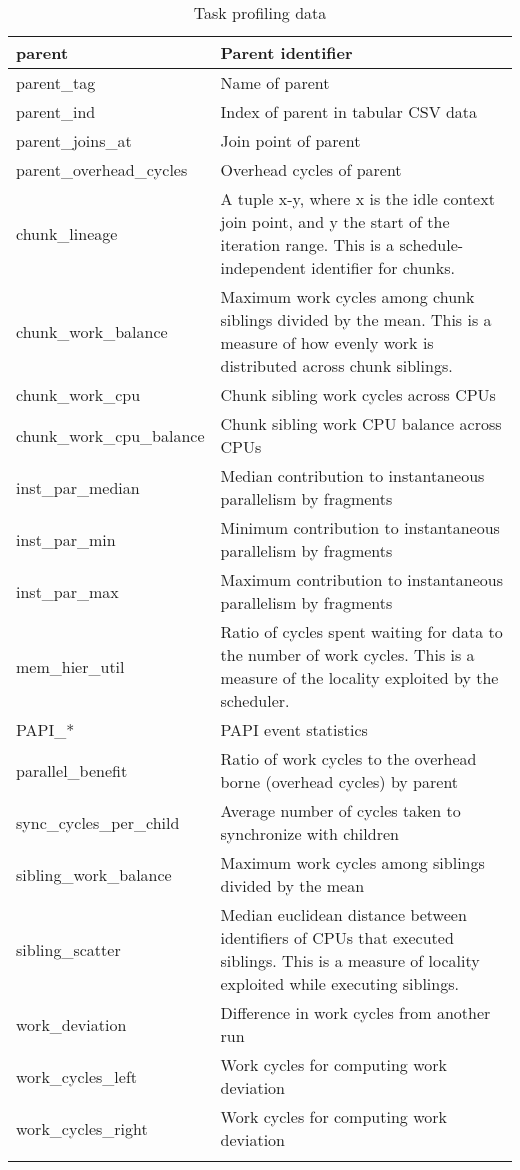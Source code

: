 \documentclass[11pt,a4paper]{article}
\begin{document}
\begin{appendices}
\begin{longtable}{|p{4cm}|p{7cm}|}
    parent & Parent identifier \\ \hline
    parent\_tag & Name of parent \\ \hline
    parent\_ind & Index of parent in tabular CSV data \\ \hline
    parent\_joins\_at & Join point of parent \\ \hline
    parent\_overhead\_cycles & Overhead cycles of parent \\ \hline
    chunk\_lineage & A tuple x-y, where x is the idle context join point, and y the start of the iteration range.  This is a schedule-independent identifier for chunks. \\ \hline
    chunk\_work\_balance & Maximum work cycles among chunk siblings divided by the mean. This is a measure of how evenly work is distributed across chunk siblings. \\ \hline
    chunk\_work\_cpu & Chunk sibling work cycles across CPUs \\ \hline
    chunk\_work\_cpu\_balance & Chunk sibling work CPU balance across CPUs \\ \hline
    inst\_par\_median & Median contribution to instantaneous parallelism by fragments \\ \hline
    inst\_par\_min & Minimum contribution to instantaneous parallelism by fragments \\ \hline
    inst\_par\_max & Maximum contribution to instantaneous parallelism by fragments \\ \hline
    mem\_hier\_util & Ratio of cycles spent waiting for data to the number of work cycles. This is a measure of the locality exploited by the scheduler. \\ \hline
    PAPI\_* & PAPI event statistics \\ \hline
    parallel\_benefit & Ratio of work cycles to the overhead borne (overhead cycles) by parent \\ \hline
    sync\_cycles\_per\_child & Average number of cycles taken to synchronize with children \\ \hline
    sibling\_work\_balance & Maximum work cycles among siblings divided by the mean \\ \hline
    sibling\_scatter & Median euclidean distance between identifiers of CPUs that executed siblings. This is a measure of locality exploited while executing siblings. \\ \hline
    work\_deviation & Difference in work cycles from another run \\ \hline
    work\_cycles\_left & Work cycles for computing work deviation \\ \hline
    work\_cycles\_right & Work cycles for computing work deviation \\ \hline
    \caption{Task profiling data}
    \label{tab:task-prof-data}
\end{longtable}

\end{appendices}
\end{document}
